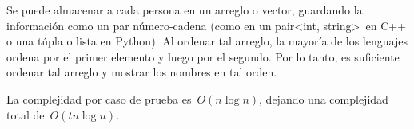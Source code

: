 
Se puede almacenar a cada persona en un arreglo o vector, guardando la información
como un par número-cadena (como en un pair\textless int, string\textgreater \, en C++
o una túpla o lista en Python). Al ordenar tal arreglo, la mayoría de los lenguajes
ordena por el primer elemento y luego por el segundo. Por lo tanto, es suficiente
ordenar tal arreglo y mostrar los nombres en tal orden.

La complejidad por caso de prueba es~$O(n\log n)$, dejando una complejidad total
de~$O(tn \log n)$.

